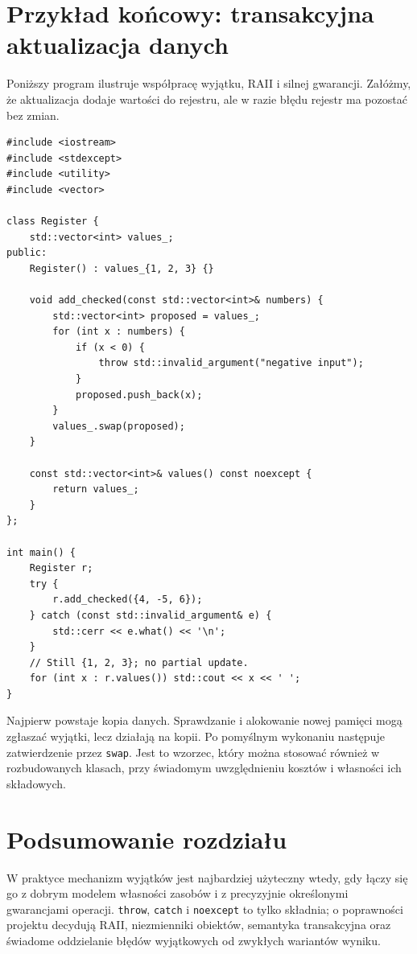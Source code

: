 \section{Przykład końcowy: transakcyjna aktualizacja danych}

Poniższy program ilustruje współpracę wyjątku, RAII i silnej gwarancji.
Załóżmy, że aktualizacja dodaje wartości do rejestru, ale w razie błędu
rejestr ma pozostać bez zmian.

\begin{lstlisting}
#include <iostream>
#include <stdexcept>
#include <utility>
#include <vector>

class Register {
    std::vector<int> values_;
public:
    Register() : values_{1, 2, 3} {}

    void add_checked(const std::vector<int>& numbers) {
        std::vector<int> proposed = values_;
        for (int x : numbers) {
            if (x < 0) {
                throw std::invalid_argument("negative input");
            }
            proposed.push_back(x);
        }
        values_.swap(proposed);
    }

    const std::vector<int>& values() const noexcept {
        return values_;
    }
};

int main() {
    Register r;
    try {
        r.add_checked({4, -5, 6});
    } catch (const std::invalid_argument& e) {
        std::cerr << e.what() << '\n';
    }
    // Still {1, 2, 3}; no partial update.
    for (int x : r.values()) std::cout << x << ' ';
}
\end{lstlisting}

Najpierw powstaje kopia danych. Sprawdzanie i alokowanie nowej pamięci
mogą zgłaszać wyjątki, lecz działają na kopii. Po pomyślnym wykonaniu
następuje zatwierdzenie przez \texttt{swap}. Jest to wzorzec, który
można stosować również w rozbudowanych klasach, przy świadomym
uwzględnieniu kosztów i własności ich składowych.

\section{Podsumowanie rozdziału}

W praktyce mechanizm wyjątków jest najbardziej użyteczny wtedy,
gdy łączy się go z dobrym modelem własności zasobów i z precyzyjnie
określonymi gwarancjami operacji. \texttt{throw}, \texttt{catch}
i \texttt{noexcept} to tylko składnia; o poprawności projektu
decydują RAII, niezmienniki obiektów, semantyka transakcyjna oraz
świadome oddzielanie błędów wyjątkowych od zwykłych wariantów wyniku.

